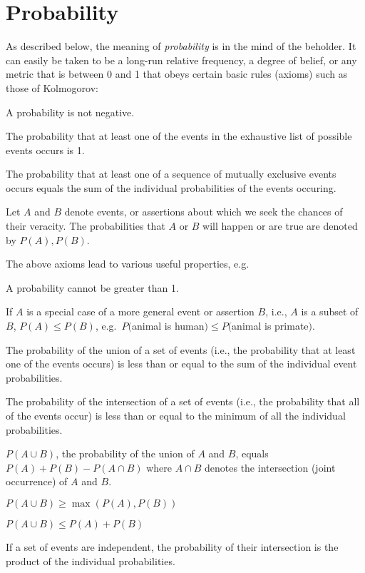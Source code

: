 \section{Probability}\label{sec:prob}
%
%
%
As described below, the meaning of \emph{probability} is in the mind
of the beholder.  It can easily be taken to be a long-run relative
frequency, a degree of belief, or any metric that is between 0 and 1
that obeys certain basic rules (axioms) such as those of Kolmogorov:
\be
\item A probability is not negative.
\item The probability that at least one of the events in the exhaustive list of
  possible events occurs is 1.
\item The probability that at least one of a sequence of mutually
  exclusive events occurs equals the sum of the individual
  probabilities of the events occuring.
\ee

Let $A$ and $B$ denote events, or assertions about which we seek the
chances of their veracity.  The probabilities that $A$ or $B$ will
happen or are true are denoted by $P(A), P(B)$.

The above axioms lead to various useful properties, e.g.
\be
\item A probability cannot be greater than 1.
\item If $A$ is a special case of a more general
  event or assertion $B$, i.e., $A$ is a subset of $B$, $P(A) \leq
  P(B)$, e.g.\ $P($animal is human$) \leq P($animal is primate$)$.
\item The probability of the union of a set of events (i.e., the
  probability that at least one of the events occurs) is less than or
  equal to the sum of the individual event probabilities.
\item The probability of the intersection of a set of events (i.e.,
  the probability that all of the events occur) is less than or
  equal to the minimum of all the individual probabilities.
\item $P(A \cup B)$, the probability of the union of $A$ and $B$,
  equals $P(A) + P(B) - P(A \cap B)$ where $A \cap B$ denotes the
  intersection (joint occurrence) of $A$ and $B$.
\item $P(A \cup B) \geq \max(P(A), P(B))$
\item $P(A \cup B) \leq P(A) + P(B)$
\item If a set of events are independent, the probability of their
  intersection is the product of the individual probabilities.
\ee

